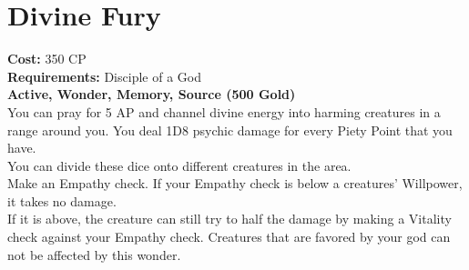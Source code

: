 \section{Divine Fury}\label{wonder:divineFury}
\textbf{Cost:} 350 CP\\
\textbf{Requirements:} Disciple of a God\\
\textbf{Active, Wonder, Memory, Source (500 Gold)}\\
You can pray for 5 AP and channel divine energy into harming creatures in a  range around you.
You deal 1D8 psychic damage for every Piety Point that you have.\\
You can divide these dice onto different creatures in the area.\\
Make an Empathy check.
If your Empathy check is below a creatures' Willpower, it takes no damage.\\
If it is above, the creature can still try to half the damage by making a Vitality check against your Empathy check.
Creatures that are favored by your god can not be affected by this wonder.\\
\\